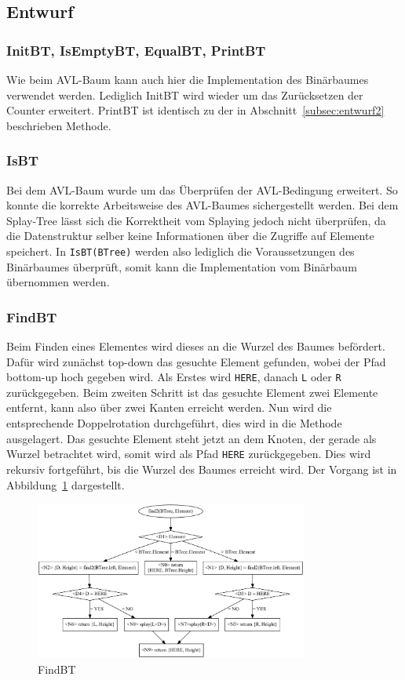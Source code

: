 \subsection{Entwurf}\label{subsec:splay-entwurf}

\subsubsection{InitBT, IsEmptyBT, EqualBT, PrintBT}
Wie beim AVL-Baum kann auch hier die Implementation des Binärbaumes verwendet werden.
Lediglich InitBT wird wieder um das Zurücksetzen der Counter erweitert.
PrintBT ist identisch zu der in Abschnitt~\ref{subsec:entwurf2} beschrieben Methode.

\subsubsection{IsBT}
Bei dem AVL-Baum wurde  um das Überprüfen der AVL-Bedingung erweitert.
So konnte die korrekte Arbeitsweise des AVL-Baumes sichergestellt werden.
Bei dem Splay-Tree lässt sich die Korrektheit vom Splaying jedoch nicht überprüfen, da die
Datenstruktur selber keine Informationen über die Zugriffe auf Elemente speichert.
In \verb|IsBT(BTree)| werden also lediglich die Voraussetzungen des Binärbaumes überprüft,
somit kann die Implementation vom Binärbaum übernommen werden.

\subsubsection{FindBT}\label{par:splay-findBT}
Beim Finden eines Elementes wird dieses an die Wurzel des Baumes befördert.
Dafür wird zunächst top-down das gesuchte Element gefunden, wobei der Pfad
bottom-up hoch gegeben wird.
Als Erstes wird \verb|HERE|, danach \verb|L| oder \verb|R| zurückgegeben.
Beim zweiten Schritt ist das gesuchte Element zwei Elemente entfernt, kann also über zwei
Kanten erreicht werden.
Nun wird die entsprechende Doppelrotation durchgeführt, dies wird in die 
Methode ausgelagert.
Das gesuchte Element steht jetzt an dem Knoten, der gerade als Wurzel betrachtet wird, somit wird
als Pfad \verb|HERE| zurückgegeben.
Dies wird rekursiv fortgeführt, bis die Wurzel des Baumes erreicht wird.
Der Vorgang ist in Abbildung~\ref{fig:splayFind} dargestellt.
\begin{figure}[hbt]
    \centering
    \includegraphics[width=0.8\textwidth]{img/gv/splayFind2}
    \caption{FindBT}
    \label{fig:splayFind}
\end{figure}

